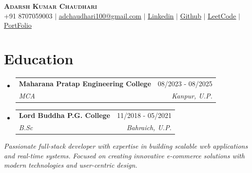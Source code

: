 \documentclass[letterpaper,11pt]{article}
\makeatletter
\newcommand{\resumeSubheading}[4]{
  \vspace{-2pt}\item
    \begin{tabular*}{0.97\textwidth}[t]{l@{\extracolsep{\fill}}r}
      \textbf{#1} & #2 \\
      \textit{\small#3} & \textit{\small #4} \\
    \end{tabular*}\vspace{-7pt}
}
\newcommand{\resumeSubHeadingListStart}{\begin{itemize}[leftmargin=0.15in, label={}]}
\newcommand{\resumeSubHeadingListEnd}{\end{itemize}}
\makeatother
\begin{document}

\begin{center}
\vspace{-1pt}
    \textbf{\Huge \scshape Adarsh Kumar Chaudhari} \\ \vspace{1pt}
    \small ‪+91 8707059003 $|$ \href{mailto:adchaudhari100@gmail.com}{\underline{adchaudhari100@gmail.com}} $|$ 
    \href{https://www.linkedin.com/in/adarsh-kumar-chaudhari-6b820b279/}{\underline{Linkedin}} $|$
    \href{https://github.com/Adarshch101}{\underline{Github}} $|$
    \href{https://leetcode.com/u/adchaudhari100/}
    {\underline{LeetCode}}  $|$
    \href{https://adarsh-chaudhari-portfolio.vercel.app/}
    {\underline{PortFolio}}
\end{center}


\vspace{-15pt}
\section{Education}
  \resumeSubHeadingListStart
    \resumeSubheading
      {Maharana Pratap Engineering College }{08/2023 - 08/2025}
      {MCA}
      {Kanpur, U.P.}

            

  \resumeSubHeadingListEnd
  \vspace{-4pt}
   \resumeSubHeadingListStart
    \resumeSubheading
      {Lord Buddha P.G. College }{11/2018 - 05/2021}
      {B.Sc}
      {Bahraich, U.P.}

            

  \resumeSubHeadingListEnd
\vspace{-13pt}

\small{\textit{Passionate full-stack developer with expertise in building scalable web applications and real-time systems.}}
\small{\textit{Focused on creating innovative e-commerce solutions with modern technologies and user-centric design.}}
\end{document}
